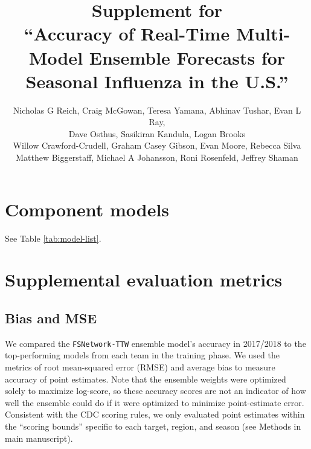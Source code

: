 \documentclass{article}\usepackage[]{graphicx}\usepackage[]{color}
\title{Supplement for\\``Accuracy of Real-Time Multi-Model Ensemble Forecasts for Seasonal Influenza in the U.S.''}
\author{Nicholas G Reich, Craig McGowan, Teresa Yamana, Abhinav Tushar, Evan L Ray,\\
Dave Osthus, Sasikiran Kandula, Logan Brooks\\
Willow Crawford-Crudell, Graham Casey Gibson, Evan Moore, Rebecca Silva\\Matthew Biggerstaff, Michael A Johansson, Roni Rosenfeld, Jeffrey Shaman}
\begin{document}
\maketitle




\section{Component models}
See Table \ref{tab:model-list}.



% 

\section{Supplemental evaluation metrics}

\subsection{Bias and MSE}

We compared the {\tt FSNetwork-TTW} ensemble model's accuracy in 2017/2018 to the top-performing models from each team in the training phase. 
We used the metrics of root mean-squared error (RMSE) and average bias to measure accuracy of point estimates.
Note that the ensemble weights were optimized solely to maximize log-score, so these accuracy scores are not an indicator of how well the ensemble could do if it were optimized to minimize point-estimate error.
Consistent with the CDC scoring rules, we only evaluated point estimates within the ``scoring bounds'' specific to each target, region, and season (see Methods in main manuscript).
\end{document}
